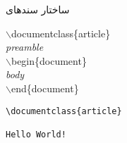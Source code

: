 \begin{plainslide}

\begin{block}{ساختار سندهای \lr{\LaTeX{}}}
\begin{latin}
$\backslash$documentclass\{article\}\\
\textit{preamble}\\
$\backslash$begin\{document\}\\
\textit{body}\\
$\backslash$end\{document\}\\
\end{latin}
\end{block}
\end{plainslide}
%
\begin{plainslide}
\begin{latin}
\begin{minipage}{.3\textwidth}{

\begin{latin}
\begin{lstlisting}
\documentclass{article}

Hello World!

\end{lstlisting}
\end{latin}

\vspace*{-0.7em}%
}\end{minipage}
\end{latin}
\end{plainslide}
%
